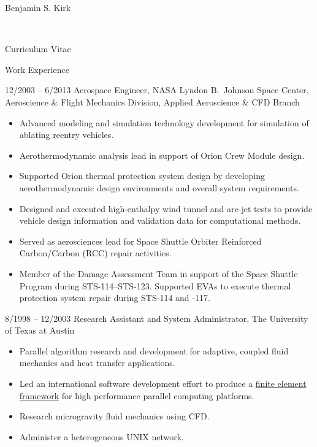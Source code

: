 \documentclass[10pt]{report}
\begin{document}
\begin{cv}{\centerline{\Large Benjamin S. Kirk}\\
    \centerline{\large Curriculum Vitae}}
\begin{cvlist}{Work Experience}
\begin{itemize}
\begin{itemize}
    \end{itemize}
  \end{itemize}



  \item[12/2003 -- 6/2013]
    Aerospace Engineer, NASA Lyndon B.\ Johnson Space Center, Aeroscience \& Flight Mechanics Division, Applied Aeroscience \& CFD Branch
      \begin{itemize}
        \item
          Advanced modeling and simulation technology development for simulation of ablating reentry vehicles.

        \item
          Aerothermodynamic analysis lead in support of Orion Crew Module design.
        \item
          Supported Orion thermal protection system design by developing aerothermodynamic
          design environments and overall system requirements.
        \item
          Designed and executed high-enthalpy wind tunnel and arc-jet tests to provide
          vehicle design information and validation data for computational methods.
        \item
          Served as aerosciences lead for Space Shuttle Orbiter Reinforced Carbon/Carbon (RCC)
          repair activities.
        \item
          Member of the Damage Assessment Team in support of the Space Shuttle Program
          during STS-114--STS-123.  Supported EVAs to execute thermal protection system
          repair during STS-114 and -117.
      \end{itemize}

    \item[8/1998 -- 12/2003]
      Research Assistant and System Administrator, The University of Texas at Austin
      \begin{itemize}
	\item
	  Parallel algorithm research and development for adaptive,
	  coupled fluid mechanics and heat transfer applications.
	\item
	  Led an international software development effort to produce
          a \href{http://libmesh.sourceforge.net}{finite element framework}
	  for high performance parallel computing platforms.
	\item
	  Research microgravity fluid mechanics using CFD.
	\item
	  Administer a heterogeneous UNIX network.
      \end{itemize}


\end{cvlist}
\end{cv}
\end{document}
